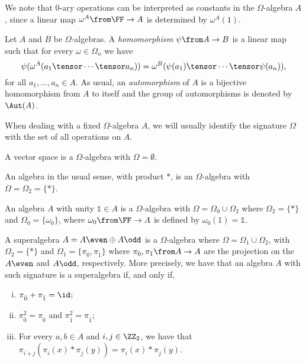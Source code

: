 We note that $0$-ary operations can be interpreted as constants in the $\Omega$-algebra $A$, since a linear map $\omega^A\from \FF \to A$ is determined by $\omega^A(1)$.

\begin{defi}
	Let $A$ and $B$ be $\Omega$-algebras.
	A \emph{homomorphism} $\psi\from A \to B$ is a linear map such that for every $\omega \in \Omega_n$ we have
	\[
		\psi( \omega^A (a_1 \tensor \cdots \tensor a_n) ) = \omega^B ( \psi(a_1) \tensor \cdots \tensor \psi(a_n) ),
	\]
	for all $a_1, \ldots, a_n \in A$.
	As usual, an \emph{automorphism} of $A$ is a bijective homomorphism from $A$ to itself and the group of automorphisms is denoted by $\Aut(A)$.
\end{defi}

When dealing with a fixed $\Omega$-algebra $A$, we will usually identify the signature $\Omega$ with the set of all operations on $A$.

\begin{ex}\label{ex:omega-vec-space}
	A vector space is a $\Omega$-algebra with $\Omega = \emptyset$.
\end{ex}

\begin{ex}\label{ex:omega-algebra}
	An algebra in the usual sense, with product $*$, is an $\Omega$-algebra with $\Omega = \Omega_2 = \{ * \}$.
\end{ex}

\begin{ex}
	An algebra $A$ with unity $\mathds{1} \in A$ is a  $\Omega$-algebra with $\Omega = \Omega_0 \cup \Omega_2$ where $\Omega_2 = \{ * \}$ and $\Omega_0 = \{ \omega_0 \}$, where $\omega_0\from \FF \to A$ is defined by $\omega_0 (1) = \mathds 1$.
\end{ex}

\begin{ex}\label{ex:omega-alg-SA}
	A superalgebra $A = A\even \oplus A\odd$ is a $\Omega$-algebra where $\Omega = \Omega_1 \cup \Omega_2$, with $\Omega_2 = \{ * \}$ and $\Omega_1 = \{ \pi_{\bar 0}, \pi_{\bar 1} \}$ where $\pi_{\bar 0}, \pi_{\bar 1}\from A \to A$ are the projection on the $A\even$ and $A\odd$, respectively.
	More precisely, we have that an algebra $A$ with such signature is a superalgebra if, and only if,
	\begin{enumerate}[(i)]
		\item $\pi_{\bar 0}^{} + \pi_{\bar 1}^{} = \id$; \label{item:sum-projections}
		\item $\pi_{\bar 0}^2 = \pi_{\bar 0}^{}$ and $\pi_{\bar 1}^2 = \pi_{\bar 1}^{}$;
		\item For every $a,b \in A$ and $i, j\in \ZZ_2$, we have that $\pi_{i+j}^{}( \pi_i^{} (x)*\pi_j^{} (y) ) = \pi_i^{} (x)*\pi_j^{} (y)$.
	\end{enumerate}
\end{ex}

